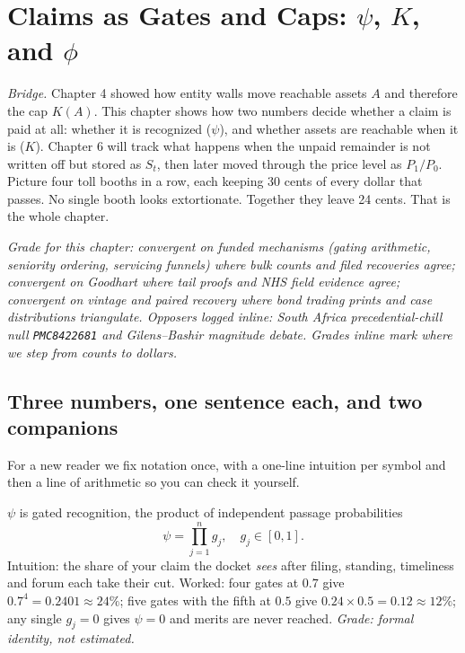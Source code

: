 \chapter{Claims as Gates and Caps: $\psi$, $K$, and $\phi$}
\label{ch:claims}

\textit{Bridge.} Chapter 4 showed how entity walls move reachable assets $A$ and therefore the cap $K(A)$. This chapter shows how two numbers decide whether a claim is paid at all: whether it is recognized ($\psi$), and whether assets are reachable when it is ($K$). Chapter 6 will track what happens when the unpaid remainder is not written off but stored as $S_t$, then later moved through the price level as $P_1/P_0$. Picture four toll booths in a row, each keeping 30 cents of every dollar that passes. No single booth looks extortionate. Together they leave 24 cents. That is the whole chapter.

\textit{Grade for this chapter: convergent on funded mechanisms (gating arithmetic, seniority ordering, servicing funnels) where bulk counts and filed recoveries agree; convergent on Goodhart where tail proofs and NHS field evidence agree; convergent on vintage and paired recovery where bond trading prints and case distributions triangulate. Opposers logged inline: South Africa precedential-chill null \texttt{PMC8422681} and Gilens--Bashir magnitude debate. Grades inline mark where we step from counts to dollars.}

\section{Three numbers, one sentence each, and two companions}
\label{sec:claims-defs}

For a new reader we fix notation once, with a one-line intuition per symbol and then a line of arithmetic so you can check it yourself.

$\psi$ is gated recognition, the product of independent passage probabilities
\begin{equation}
\psi = \prod_{j=1}^{n} g_j,\quad g_j \in [0,1].
\label{eq:psi5}
\end{equation}
Intuition: the share of your claim the docket \textit{sees} after filing, standing, timeliness and forum each take their cut. Worked: four gates at $0.7$ give $0.7^4=0.2401\approx24\%$; five gates with the fifth at $0.5$ give $0.24\times0.5=0.12\approx12\%$; any single $g_j=0$ gives $\psi=0$ and merits are never reached. \textit{Grade: formal identity, not estimated.}

